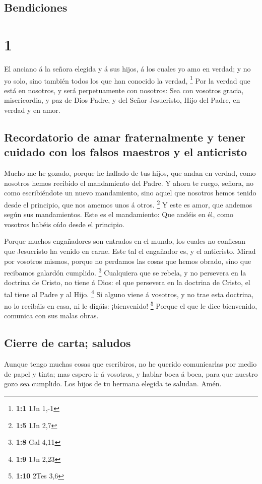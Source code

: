 \hypertarget{bendiciones}{%
\subsection{Bendiciones}\label{bendiciones}}

\hypertarget{section}{%
\section{1}\label{section}}

 El anciano á la señora elegida y á sus hijos, á los cuales
yo amo en verdad; y no yo solo, sino también todos los que han conocido
la verdad, \footnote{\textbf{1:1} 1Jn 1,-1}  Por la verdad
que está en nosotros, y será perpetuamente con nosotros: 
Sea con vosotros gracia, misericordia, y paz de Dios Padre, y del Señor
Jesucristo, Hijo del Padre, en verdad y en amor.

\hypertarget{recordatorio-de-amar-fraternalmente-y-tener-cuidado-con-los-falsos-maestros-y-el-anticristo}{%
\subsection{Recordatorio de amar fraternalmente y tener cuidado con los
falsos maestros y el
anticristo}\label{recordatorio-de-amar-fraternalmente-y-tener-cuidado-con-los-falsos-maestros-y-el-anticristo}}

 Mucho me he gozado, porque he hallado de tus hijos, que
andan en verdad, como nosotros hemos recibido el mandamiento del Padre.
 Y ahora te ruego, señora, no como escribiéndote un nuevo
mandamiento, sino aquel que nosotros hemos tenido desde el principio,
que nos amemos unos á otros. \footnote{\textbf{1:5} 1Jn 2,7}
 Y este es amor, que andemos según sus mandamientos. Este es
el mandamiento: Que andéis en él, como vosotros habéis oído desde el
principio.

 Porque muchos engañadores son entrados en el mundo, los
cuales no confiesan que Jesucristo ha venido en carne. Este tal el
engañador es, y el anticristo.  Mirad por vosotros mismos,
porque no perdamos las cosas que hemos obrado, sino que recibamos
galardón cumplido. \footnote{\textbf{1:8} Gal 4,11} 
Cualquiera que se rebela, y no persevera en la doctrina de Cristo, no
tiene á Dios: el que persevera en la doctrina de Cristo, el tal tiene al
Padre y al Hijo. \footnote{\textbf{1:9} 1Jn 2,23}  Si
alguno viene á vosotros, y no trae esta doctrina, no lo recibáis en
casa, ni le digáis: ¡bienvenido! \footnote{\textbf{1:10} 2Tes 3,6}
 Porque el que le dice bienvenido, comunica con sus malas
obras.

\hypertarget{cierre-de-carta-saludos}{%
\subsection{Cierre de carta; saludos}\label{cierre-de-carta-saludos}}

 Aunque tengo muchas cosas que escribiros, no he querido
comunicarlas por medio de papel y tinta; mas espero ir á vosotros, y
hablar boca á boca, para que nuestro gozo sea cumplido. 
Los hijos de tu hermana elegida te saludan. Amén.
